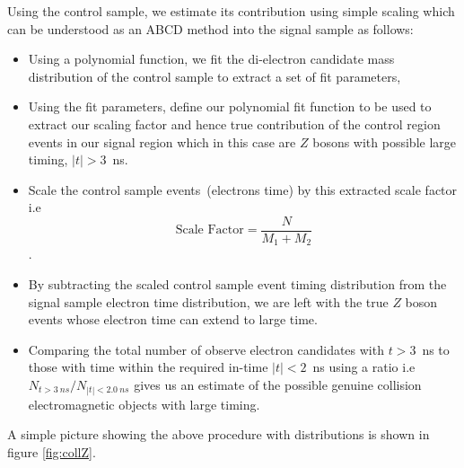 \begin{center}
\label{fig:Zmass}
\end{center}


Using the control sample, we estimate its contribution  using simple scaling which can be understood as an ABCD method into the signal sample as follows:
\begin{itemize}
\item Using a polynomial function, we fit the di-electron candidate mass distribution of the control sample to extract a set of fit parameters,
\item Using the fit parameters, define our polynomial fit function to be used to extract our scaling factor and hence true contribution of the control region events in our signal region which in this case are $Z$ bosons with possible large timing, $|t| > 3$~ns.
\item Scale the control sample events~(electrons time) by this extracted scale factor i.e $$\displaystyle{\mbox{Scale Factor} = \frac{N}{M_{1} + M_{2}}}$$.
\item By subtracting the scaled control sample event timing distribution from the signal sample electron time distribution, we are left with the true $Z$ boson events whose electron time can extend to large time.
\item Comparing the total number of observe electron candidates with $t > 3$~ns to those with time within the required in-time $|t| < 2$~ns using a ratio i.e $ N_{t > 3~ns}/ N_{|t| < 2.0~ns}$ gives us an estimate of the possible genuine collision electromagnetic objects with large timing. 
\end{itemize}  

A simple picture showing the above procedure with distributions is shown in figure \ref{fig:collZ}.

